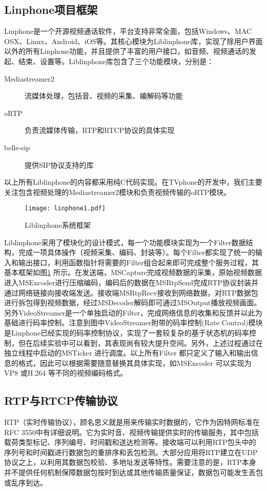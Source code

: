     \subsection{Linphone项目框架}
    Linphone是一个开源视频通话软件，平台支持非常全面，包括Windows、MAC OSX、Linux、Android、iOS等。其核心模块为Liblinphone库，实现了除用户界面以外的所有Linphone功能，并且提供了丰富的用户接口，如音频、视频通话的发起、结束、设置等。Liblinphone库包含了三个功能模块，分别是：
    \begin{description}
        \item[Mediastreamer2] 流媒体处理，包括音、视频的采集、编解码等功能
        \item[oRTP] 负责流媒体传输，RTP和RTCP协议的具体实现
        \item[belle-sip] 提供SIP协议支持的库
    \end{description}
    以上所有Liblinphone的内容都采用纯C代码实现。在TVphone的开发中，我们主要关注包含视频处理的Mediastreamer2模块和负责视频传输的oRTP模块。

    \begin{figure}[htbp]
      \centering
      \texttt{[image: linphone1.pdf]}
      \caption{Liblinphone系统框架}
      \label{fig:linphone1}
    \end{figure}

    Liblinphone采用了模块化的设计模式，每一个功能模块实现为一个Filter数据结构，完成一项具体操作（视频采集、编码、封装等）。每个Filter都实现了统一的输入和输出接口，利用函数指针将需要的Filter组合起来即可完成整个服务过程，其基本框架如图\ref{fig:linphone1} 所示。在发送端，MSCapture完成视频数据的采集，原始视频数据进入MSEncoder进行压缩编码，编码后的数据在MSRtpSend完成RTP协议封装并通过网络链接向接收端发送。接收端MSRtpRecv接收到网络数据，对RTP数据包进行拆包得到视频数据，经过MSDecoder解码即可通过MSOutput播放视频画面。另外VideoStreamer是一个单独启动的Filter，完成网络信息的收集和反馈并以此为基础进行码率控制。注意到图中VideoStreamer附带的码率控制(Rate Control)模块是Linphone已经实现的码率控制协议，实现了一套较复杂的基于状态机的码率控制，但在后续实验中可以看到，其表现尚有较大提升空间。另外，上述过程通过在独立线程中启动的MSTicker 进行调度。以上所有Filter 都只定义了输入和输出信息的格式，因此可以根据需要随意替换其具体实现，如MSEncoder 可以实现为VP8 或H.264 等不同的视频编码格式。

    \subsection{RTP与RTCP传输协议}
    RTP（实时传输协议），顾名思义就是用来传输实时数据的，它作为因特网标准在RFC 3550\cite{jacobson2003rtp}中有详细说明。它为实时音、视频传输提供实时的传输服务，其中包括载荷类型标记、序列编号、时间戳和送达检测等。接收端可以利用RTP包头中的序列号和时间戳进行数据包的重排序和丢包检测。大部分应用将RTP建立在UDP协议之上，以利用其数据包校验、多地址发送等特性。需要注意的是，RTP本身并不提供任何机制保障数据包按时到达或其他传输质量保证，数据包可能发生丢包或乱序到达。

